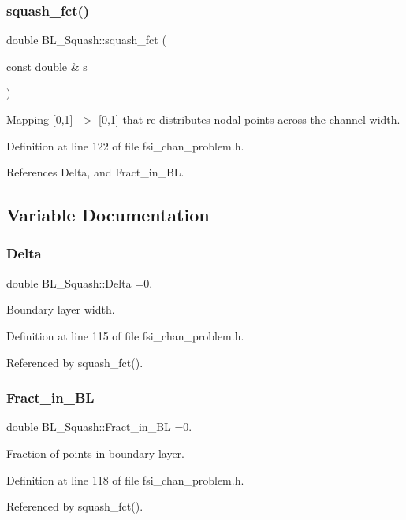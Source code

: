 \subsubsection{\texorpdfstring{squash\+\_\+fct()}{squash\_fct()}}
{\footnotesize\ttfamily double B\+L\+\_\+\+Squash\+::squash\+\_\+fct (\begin{DoxyParamCaption}\item[{const double \&}]{s }\end{DoxyParamCaption})}



Mapping \mbox{[}0,1\mbox{]} -\/$>$ \mbox{[}0,1\mbox{]} that re-\/distributes nodal points across the channel width. 



Definition at line 122 of file fsi\+\_\+chan\+\_\+problem.\+h.



References Delta, and Fract\+\_\+in\+\_\+\+BL.



\subsection{Variable Documentation}
\mbox{\label{namespaceBL__Squash_a3c4183891049bca81f3a011db24fc579}} 
\subsubsection{\texorpdfstring{Delta}{Delta}}
{\footnotesize\ttfamily double B\+L\+\_\+\+Squash\+::\+Delta =0.}



Boundary layer width. 



Definition at line 115 of file fsi\+\_\+chan\+\_\+problem.\+h.



Referenced by squash\+\_\+fct().

\mbox{\label{namespaceBL__Squash_af84bda39008884cd2b01e630957573df}} 
\subsubsection{\texorpdfstring{Fract\+\_\+in\+\_\+\+BL}{Fract\_in\_BL}}
{\footnotesize\ttfamily double B\+L\+\_\+\+Squash\+::\+Fract\+\_\+in\+\_\+\+BL =0.}



Fraction of points in boundary layer. 



Definition at line 118 of file fsi\+\_\+chan\+\_\+problem.\+h.



Referenced by squash\+\_\+fct().

